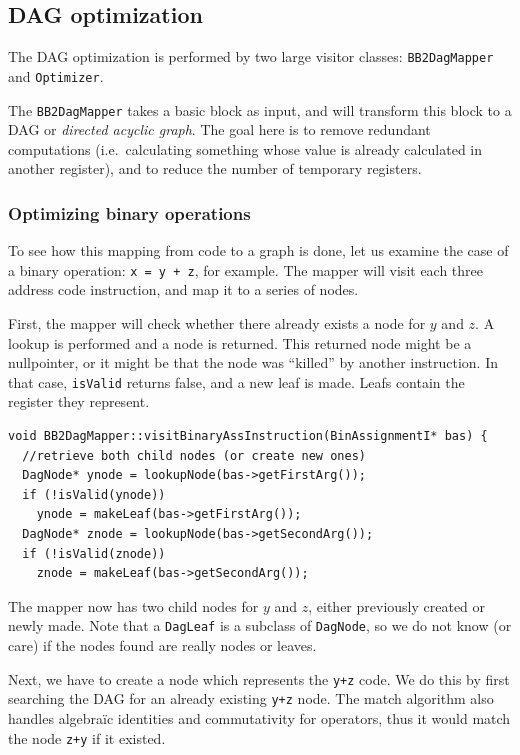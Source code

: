 \documentclass[a4paper]{article}
\begin{document}
\subsection{DAG optimization}

The DAG optimization is performed by two large visitor classes:
\texttt{BB2DagMapper} and \texttt{Optimizer}.

The \texttt{BB2DagMapper} takes a basic block as input, and will transform
this block to a DAG or \textsl{directed acyclic graph}. The goal here is to
remove redundant computations (i.e.~calculating something whose value is
already calculated in another register), and to reduce the number of temporary
registers.

\subsubsection{Optimizing binary operations}

To see how this mapping from code to a graph is done, let us examine the case
of a binary operation: \texttt{x = y + z}, for example. The mapper will visit
each three address code instruction, and map it to a series of nodes.

First, the mapper will check whether there already exists a node for $y$ and
$z$. A lookup is performed and a node is returned. This returned node might be
a nullpointer, or it might be that the node was ``killed'' by another
instruction. In that case, \texttt{isValid} returns false, and a new leaf is
made. Leafs contain the register they represent.

\begin{verbatim}
void BB2DagMapper::visitBinaryAssInstruction(BinAssignmentI* bas) {
  //retrieve both child nodes (or create new ones)
  DagNode* ynode = lookupNode(bas->getFirstArg());
  if (!isValid(ynode))
    ynode = makeLeaf(bas->getFirstArg());
  DagNode* znode = lookupNode(bas->getSecondArg());
  if (!isValid(znode))
    znode = makeLeaf(bas->getSecondArg());
\end{verbatim}

The mapper now has two child nodes for $y$ and $z$, either previously created
or newly made. Note that a \texttt{DagLeaf} is a subclass of \texttt{DagNode},
so we do not know (or care) if the nodes found are really nodes or leaves.

Next, we have to create a node which represents the \texttt{y+z} code.
We do this by first searching the DAG for an already existing \texttt{y+z}
node. The match algorithm also handles algebra\"ic identities and
commutativity for operators, thus it would match the node \texttt{z+y} if it
existed.
\end{document}
